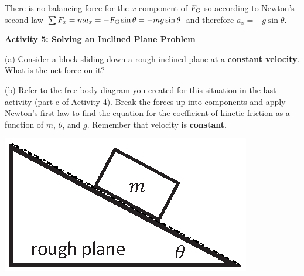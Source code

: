 There is no balancing force for the $x$-component of $F_{\rm G}$ so according to Newton's
second law \( \sum F_{x}  = ma_{x} = -F_{\rm G} \sin \theta
= - mg \sin \theta  \) and therefore \( a_{x} = - g \sin \theta  \).

\textbf{Activity 5: Solving an Inclined Plane Problem} 

(a) Consider a block sliding down a rough inclined plane at a \textbf{constant velocity}. What is the net force on it?
\vspace{20mm}

(b) Refer to the free-body diagram you created for this situation in the last
activity (part c of Activity 4). Break the forces up into components and apply Newton's first law to
find the equation for the coefficient of kinetic friction as a function of $m$,
\( \theta  \), and $g$. Remember that velocity is \textbf{constant}.

\vspace{0.3cm}
{\par\centering \includegraphics{friction/rough_plane.eps} \par}
\vspace{0.3cm}


